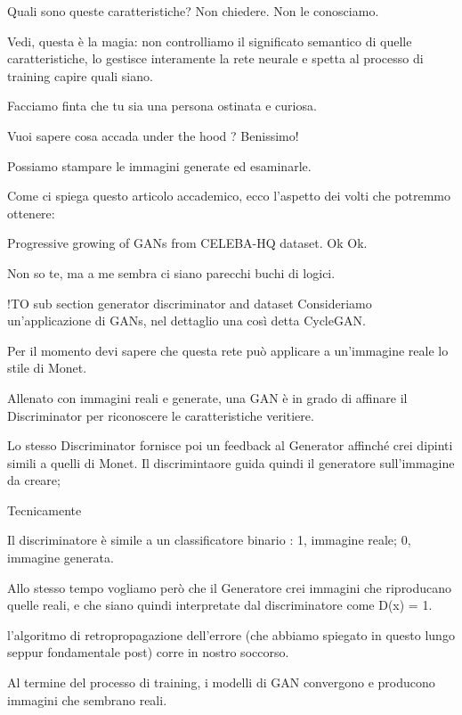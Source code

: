 Quali sono queste caratteristiche? Non chiedere. Non le conosciamo.

Vedi, questa è la magia: non controlliamo il significato semantico di quelle caratteristiche, lo gestisce interamente la rete neurale e spetta al processo di training capire quali siano.

Facciamo finta che tu sia una persona ostinata e curiosa.

Vuoi sapere cosa accada under the hood ? Benissimo!

Possiamo stampare le immagini generate ed esaminarle.

Come ci spiega questo articolo accademico, ecco l’aspetto dei volti che potremmo ottenere:


Progressive growing of GANs from CELEBA-HQ dataset.
Ok Ok.

Non so te, ma a me sembra ci siano parecchi buchi di logici.





!TO sub section generator discriminator and dataset
Consideriamo un’applicazione di GANs, nel dettaglio una così detta CycleGAN.

Per il momento devi sapere che questa rete può applicare a un’immagine reale lo stile di Monet.


Allenato con immagini reali e generate, una GAN è in grado di affinare il Discriminator per riconoscere le caratteristiche veritiere.

Lo stesso Discriminator fornisce poi un feedback al Generator affinché crei dipinti simili a quelli di Monet.
Il discrimintaore guida quindi il generatore sull’immagine da creare;

Tecnicamente 



Il discriminatore è simile a un classificatore binario : 1, immagine reale; 0, immagine generata.

Allo stesso tempo vogliamo però che il Generatore crei immagini che riproducano quelle reali, e che siano quindi interpretate dal discriminatore come D(x) = 1.

 l’algoritmo di retropropagazione dell’errore (che abbiamo spiegato in questo lungo seppur fondamentale post) corre in nostro soccorso.


Al termine del processo di training, i modelli di GAN convergono e producono immagini che sembrano reali.


